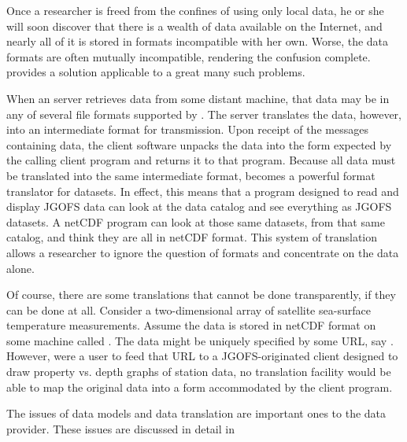   Once a researcher is freed from the
confines of using only local data, he or she will soon discover that
there is a wealth of data available on the Internet, and nearly all of
it is stored in formats incompatible with her own. Worse, the data
formats are often mutually incompatible, rendering the confusion
complete.  \opendap provides a solution applicable to a great many such
problems.

  When an \opendap server
retrieves data from some distant machine, that data may be in any of
several file formats supported by \opendap. The server translates the
data, however, into an intermediate format for transmission. Upon
receipt of the messages containing data, the \opendap client software
unpacks the data into the form expected by the calling client program
and returns it to that program.  Because all data must be translated
into the same intermediate format, \opendap becomes a powerful format
translator for datasets. In effect, this means that a program
designed to read and display JGOFS data can look at the \opendap data
catalog and see everything as JGOFS datasets. A netCDF program can
look at those same datasets, from that same catalog, and think they
are all in netCDF format. This system of translation allows a
researcher to ignore the question of formats and concentrate on the
data alone.

Of course, there are some translations that cannot be done
transparently, if they can be done at all. Consider a two-dimensional
array of satellite sea-surface temperature measurements. Assume the
data is stored in netCDF format on some machine called
. The data might be uniquely specified by some URL,
say . However, were a user to
feed that URL to a JGOFS-originated \opendap client designed to draw
property vs. depth graphs of station data, no translation facility
would be able to map the original data into a form accommodated by the
client program.

The issues of data models and data translation are important ones to
the data provider. These issues are discussed in detail in


%
%
%
%


